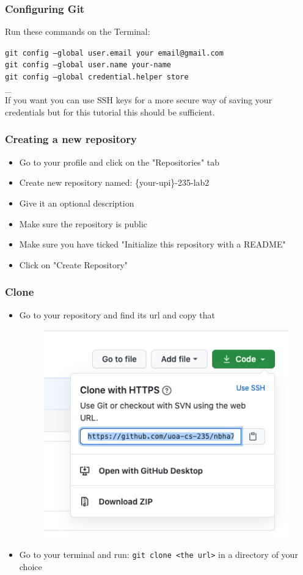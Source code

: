 \documentclass{beamer}
\begin{document}
\begin{frame}
\frametitle{Configuring Git}
	Run these commands on the Terminal: 
	\linebreak

  \texttt{git config --global user.email your email@gmail.com} \\ 
  \texttt{git config --global user.name your-name}\\ 
  \texttt{git config --global credential.helper store} \\ \_\\If you want you can use SSH keys for a more secure way of saving your credentials but for this tutorial this should be sufficient.
\end{frame}

\begin{frame}
	\frametitle{Creating a new repository}
	\begin{itemize}
		\item Go to your profile and click on the "Repositories" tab 
		\item Create new repository named: \{your-upi\}-235-lab2
		\item Give it an optional description
		\item Make sure the repository is public
		\item Make sure you have ticked "Initialize this repository with a README"
		\item Click on "Create Repository"
	\end{itemize}
\end{frame}


\begin{frame}
  \frametitle{Clone}
  \begin{itemize}
  	\item Go to your repository and find its url and copy that
  	\begin{figure}
		\includegraphics[scale=0.3]{./git-url}
	\end{figure}
	\item Go to your terminal and run: \texttt{git clone <the url>} in a directory of your choice
 \end{itemize}
\end{frame}
\end{document}
